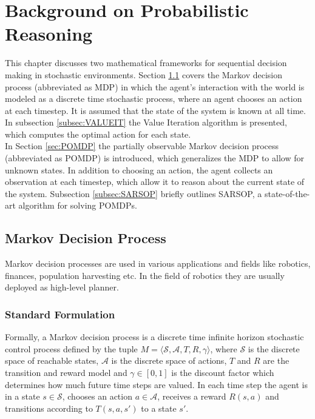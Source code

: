 \chapter{Background on Probabilistic Reasoning}
\label{chap:probabilistic}

This chapter discusses two mathematical frameworks for sequential decision making in stochastic environments. Section \ref{sec:MDP} covers the Markov decision process (abbreviated as MDP) in which the agent's interaction with the world is modeled as a discrete time stochastic process, where an agent chooses an action at each timestep. It is assumed that the state of the system is known at all time. In subsection \ref{subsec:VALUEIT} the Value Iteration algorithm is presented, which computes the optimal action for each state.\\
In Section \ref{sec:POMDP} the partially observable Markov decision process (abbreviated as POMDP) is introduced, which generalizes the MDP to allow for unknown states. In addition to choosing an action, the agent collects an observation at each timestep, which allow it to reason about the current state of the system. Subsection \ref{subsec:SARSOP} briefly outlines SARSOP, a state-of-the-art algorithm for solving POMDPs.  
\section{Markov Decision Process}\label{sec:MDP}
Markov decision processes are used in various applications and fields like robotics, finances, population harvesting \cite{MDPsurvey} etc. In the field of robotics they are usually deployed as high-level planner. 
\subsection{Standard Formulation}\label{subsec:MDPFormulation}
Formally, a Markov decision process is a discrete time infinite horizon stochastic control process defined by the tuple $M = \langle \mathcal{S}, \mathcal{A}, T, R, \gamma \rangle$, where $\mathcal{S}$ is the discrete space of reachable states, $\mathcal{A}$ is the discrete space of actions, $T$ and $R$ are the transition and reward model and $\gamma \in [0,1]$ is the discount factor which determines how much future time steps are valued. In each time step the agent is in a state $s\in\mathcal{S}$, chooses an action $a\in\mathcal{A}$, receives a reward $R(s,a)$ and transitions according to $T(s,a,s')$ to a state $s'$.\\

